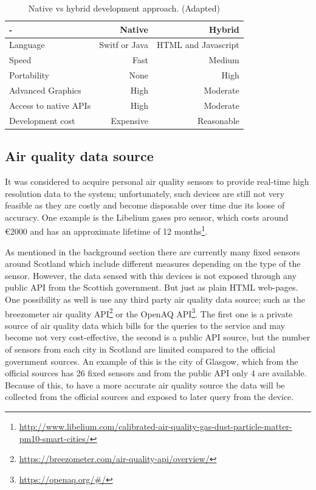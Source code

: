 \begin{table}[ht]
\centering
\begin{adjustbox}{width=.6\textwidth,center=\textwidth}
\begin{tabular}{lrr}
  \hline
   - & Native & Hybrid  \\ \hline
   Language & Switf or Java & HTML and Javascript \\
   Speed & Fast & Medium \\
   Portability & None & High \\
   Advanced Graphics & High & Moderate \\
   Access to native APIs & High & Moderate \\
   Development cost & Expensive & Reasonable \\
   \hline
\end{tabular}
\end{adjustbox}
  \caption[Native vs hybrid development approach ]{Native vs hybrid development approach. (Adapted) \footnotemark }
\label{tab:development_approaches}
\end{table} 

\subsection{Air quality data source}
It was considered to acquire personal air quality sensors to provide real-time high resolution data to the system; unfortunately, such devices are still not very feasible as they are costly and become disposable over time due its loose of accuracy. One example is the Libelium gases pro sensor, which costs around \euro{}2000 and has an approximate lifetime of 12 months\footnote{\url{http://www.libelium.com/calibrated-air-quality-gas-dust-particle-matter-pm10-smart-cities/}}. 

As mentioned in the background section there are currently many fixed sensors around Scotland which include different measures depending on the type of the sensor. However, the data sensed with this devices is not exposed through any public API from the Scottish government. But just as plain HTML web-pages. One possibility as well is use any third party air quality data source; such as the breezometer air quality API\footnote{\url{https://breezometer.com/air-quality-api/overview/}} or the OpenAQ API\footnote{\url{https://openaq.org/#/}}. The first one is a private source of air quality data which bills for the queries to the service and may become not very cost-effective, the second is a public API source, but the number of sensors from each city in Scotland are limited compared to the official government sources. An example of this is the city of Glasgow, which from the official sources has 26 fixed sensors and from the public API only 4 are available. Because of this, to have a more accurate air quality source the data will be collected from the official sources and exposed to later query from the device. 

